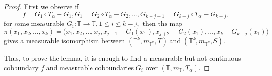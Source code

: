 \documentclass[12pt]{amsart}
\theoremstyle{definition}
\theoremstyle{plain}
\theoremstyle{definition}
\numberwithin{equation}{section}
\begin{document}
\begin{proof}

First we observe if 
\begin{equation}\label{eq: all coboundaries}
f=G_1 \circ T_\alpha -G_1, G_1=G_2 \circ T_\alpha-G_2,\dots, G_{k-j-1}=G_{k-j} \circ T_\alpha -G_{k-j},
\end{equation}
for some measurable $G_i\colon \mathbb{T} \rightarrow \mathbb{T}, 1 \leq i \leq k-j,$ %
then the map $$\pi(x_1,x_2,\dots,x_k)=\Big(x_1,x_2,\dots,x_j,x_{j+1}-G_1(x_1),x_{j+2}-G_2(x_1),\dots,x_k-G_{k-j}(x_1)\Big)$$
gives a measurable isomorphism between $(\mathbb{T}^{k},m_{\mathbb{T}^{k}},T)$ and $(\mathbb{T}^{k},m_{\mathbb{T}^{k}},S).$ 

Thus, to prove the lemma, it is enough to find a measurable but not continuous coboundary $f$ and measurable coboundaries $G_i$ over $(\mathbb{T},m_{\mathbb{T}},T_\alpha)$. 


\end{proof}
\end{document}
